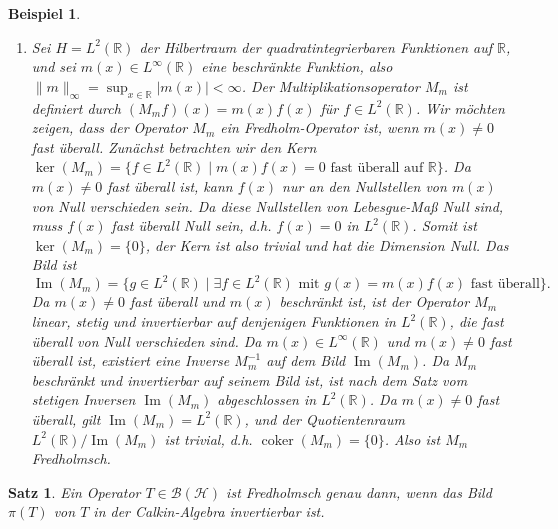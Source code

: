 \documentclass[11pt, hidelinks]{article}
\newcommand{\h}{\mathcal{H}}
\numberwithin{conj}{section}
\newtheorem{example}[conj]{Beispiel}
\newtheorem{theorem}[conj]{Satz}
\begin{document}
\begin{example}
\begin{enumerate}
        \item Sei \( H = L^2(\mathbb{R}) \) der Hilbertraum der quadratintegrierbaren Funktionen auf \( \mathbb{R} \), und sei \( m(x) \in L^\infty(\mathbb{R}) \) eine beschränkte Funktion, also \( \|m\|_\infty = \sup_{x \in \mathbb{R}} |m(x)| < \infty \). Der Multiplikationsoperator \( M_m \) ist definiert durch \( (M_m f)(x) = m(x) f(x) \) für \( f \in L^2(\mathbb{R}) \). Wir möchten zeigen, dass der Operator \( M_m \) ein Fredholm-Operator ist, wenn \( m(x) \neq 0 \) fast überall. Zunächst betrachten wir den Kern $\ker(M_m) = \{ f \in L^2(\mathbb{R}) \mid m(x) f(x) = 0 \text{ fast überall auf } \mathbb{R} \}$. Da \( m(x) \neq 0 \) fast überall ist, kann \( f(x) \) nur an den Nullstellen von \( m(x) \) von Null verschieden sein. Da diese Nullstellen von Lebesgue-Maß Null sind, muss \( f(x) \) fast überall Null sein, d.h. \( f(x) = 0 \) in \( L^2(\mathbb{R}) \). Somit ist \( \ker(M_m) = \{0\} \), der Kern ist also trivial und hat die Dimension Null. Das Bild ist $\operatorname{Im}(M_m) = \{ g \in L^2(\mathbb{R}) \mid \exists f \in L^2(\mathbb{R}) \text{ mit } g(x) = m(x) f(x) \text{ fast überall} \}.$ Da \( m(x) \neq 0 \) fast überall und \( m(x) \) beschränkt ist, ist der Operator \( M_m \) linear, stetig und invertierbar auf denjenigen Funktionen in \( L^2(\mathbb{R}) \), die fast überall von Null verschieden sind. Da $m(x) \in L^\infty(\mathbb{R})$ und $m(x) \neq 0$ fast überall ist, existiert eine Inverse $M_m^{-1}$ auf dem Bild $\operatorname{Im}(M_m)$. Da $M_m$ beschränkt und invertierbar auf seinem Bild ist, ist nach dem Satz vom stetigen Inversen $\operatorname{Im}(M_m)$ abgeschlossen in $L^2(\mathbb{R})$. Da \( m(x) \neq 0 \) fast überall, gilt \( \operatorname{Im}(M_m) = L^2(\mathbb{R}) \), und der Quotientenraum \( L^2(\mathbb{R}) / \operatorname{Im}(M_m) \) ist trivial, d.h. \( \operatorname{coker}(M_m) = \{0\} \). Also ist $M_m$ Fredholmsch.
    \end{enumerate}
\end{example}

\begin{theorem}
    Ein Operator $T \in \mathcal{B}(\h)$ ist Fredholmsch genau dann, wenn das Bild $\pi(T)$ von $T$ in der Calkin-Algebra invertierbar ist.
\end{theorem}
\end{document}
